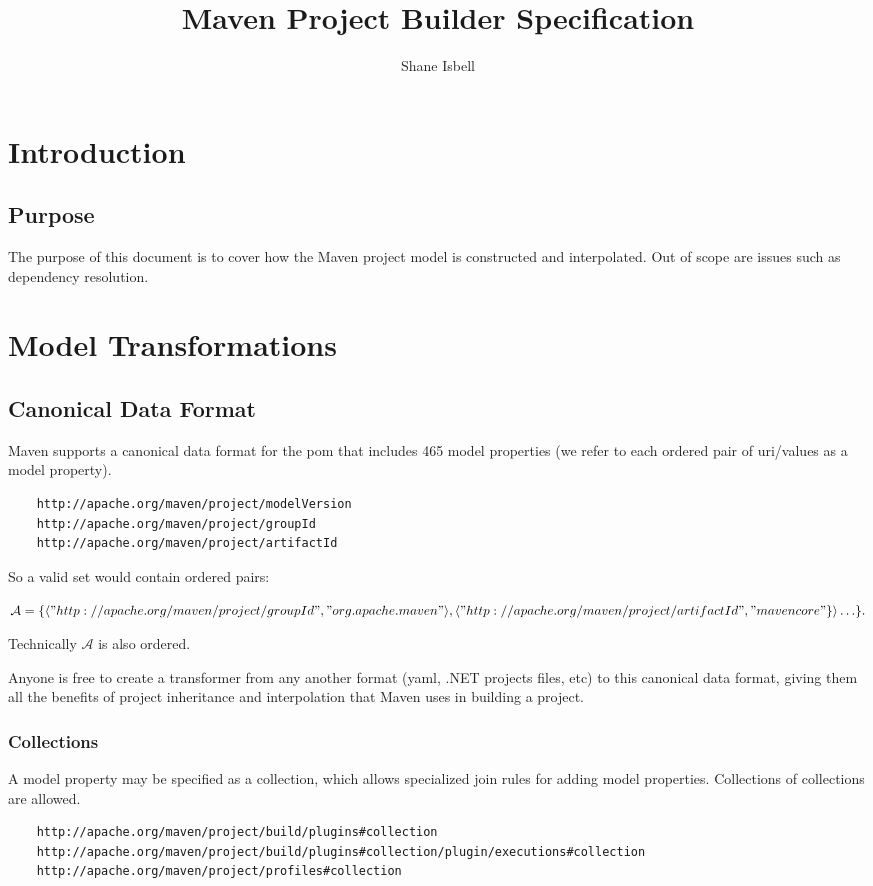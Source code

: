 \documentclass[12pt]{amsart}
\title{Maven Project Builder Specification}
\author{Shane Isbell}
\begin{document}
\maketitle
\tableofcontents
\section{Introduction}
\subsection{Purpose}
The purpose of this document is to cover how the Maven project model is constructed and interpolated. Out of scope are issues such as dependency resolution.


\section{Model Transformations}
\subsection{Canonical Data Format}
Maven supports a canonical data format for the pom that includes 465 model properties (we refer to each ordered pair of uri/values as a model property). 
\begin{verbatim}
	http://apache.org/maven/project/modelVersion
	http://apache.org/maven/project/groupId
	http://apache.org/maven/project/artifactId
\end{verbatim}

So a valid set would contain ordered pairs:

\begin{math}
	\mathcal{A}= \{\langle "http://apache.org/maven/project/groupId", "org.apache.maven"\rangle,   
	\langle "http://apache.org/maven/project/artifactId", "mavencore"\}\rangle \ldots\}.
\end{math}

Technically \begin{math}\mathcal{A}\end{math} is also ordered.

Anyone is free to create a transformer from any another format (yaml, .NET projects files, etc) to this canonical data format, giving them all the benefits of project inheritance and interpolation that Maven uses in building a project.

\subsubsection{Collections}
A model property may  be specified as a collection, which allows specialized join rules for adding model properties. Collections of collections are allowed.
\begin{verbatim}
	http://apache.org/maven/project/build/plugins#collection
	http://apache.org/maven/project/build/plugins#collection/plugin/executions#collection
	http://apache.org/maven/project/profiles#collection
\end{verbatim}
  
\end{document}
